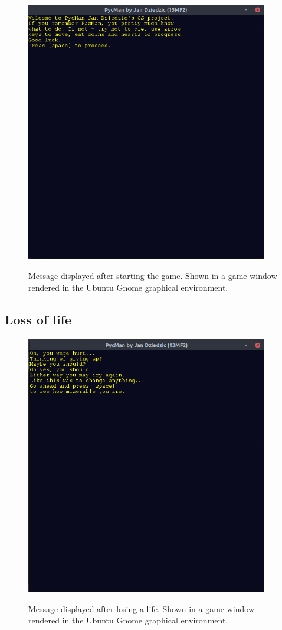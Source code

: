 \documentclass[11pt,a4paper,notitlepage]{report}
\newcommand{\dsubsection}[1]{\FloatBarrier \subsection{#1}}
\newenvironment{img}{
	\begin{center}
		\begin{figure}[H]
			\begin{center}
			
}{
	\end{center}
		\end{figure}
			\end{center}
}
\begin{document}
				\begin{img}
					\includegraphics[width=300pt]{images/tutorial.png}\\
					\caption{Message displayed after starting the game. Shown in a game window rendered in the Ubuntu Gnome graphical environment.}
				\end{img}
			\dsubsection{Loss of life}
				\begin{img}
					\includegraphics[width=300pt]{images/loss_of_life_msg.png}\\
					\caption{Message displayed after losing a life. Shown in a game window rendered in the Ubuntu Gnome graphical environment.}
				\end{img}
\end{document}
